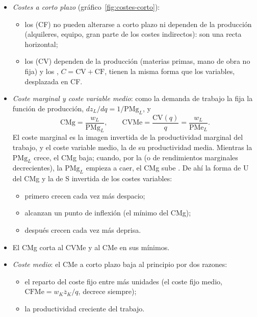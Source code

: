 \documentclass[11pt]{article}
\begin{document}
\begin{itemize}
\item \emph{Costes a corto plazo} (gráfico~\ref{fig:costes-corto}):
  \begin{itemize}
  \item los  (CF) no pueden alterarse a corto plazo ni dependen de la producción (alquileres, equipo, gran parte de los costes indirectos): son una recta horizontal;
  \item los  (CV) dependen de la producción (materias primas, mano de obra no fija) y los , $C=\mathrm{CV}+\mathrm{CF}$, tienen la misma forma que los variables, desplazada en CF.
  \end{itemize}
\item \emph{Coste marginal y coste variable medio}: como la demanda de trabajo la fija la función de producción, $dz_L/dq=1/\mathrm{PMg}_L$, y
  \begin{equation}
  \mathrm{CMg}=\frac{w_L}{\mathrm{PMg}_L},\qquad \mathrm{CVMe}=\frac{\mathrm{CV}(q)}{q}=\frac{w_L}{\mathrm{PMe}_L}. \label{eq:cmg-corto}
  \end{equation}
  El coste marginal es la imagen invertida de la productividad marginal del trabajo, y el coste variable medio, la de su productividad media. Mientras la $\mathrm{PMg}_L$ crece, el CMg baja; cuando, por la  (o de rendimientos marginales decrecientes), la $\mathrm{PMg}_L$ empieza a caer, el CMg sube . De ahí la forma de U del CMg y la de S invertida de los costes variables:
  \begin{itemize}
  \item primero crecen cada vez más despacio;
  \item alcanzan un punto de inflexión (el mínimo del CMg);
  \item después crecen cada vez más deprisa.
  \end{itemize}
\item El CMg corta al CVMe y al CMe en sus mínimos.
\item \emph{Coste medio}: el CMe a corto plazo baja al principio por dos razones:
  \begin{itemize}
  \item el reparto del coste fijo entre más unidades (el coste fijo medio, $\mathrm{CFMe}=w_K\overline{z}_K/q$, decrece siempre);
  \item la productividad creciente del trabajo.
  \end{itemize}

\end{itemize}
\end{document}
